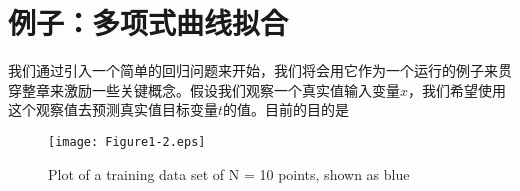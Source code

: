 \section{例子：多项式曲线拟合}
	我们通过引入一个简单的回归问题来开始，我们将会用它作为一个运行的例子来贯穿整章来激励一些关键概念。假设我们观察一个真实值输入变量$x$，我们希望使用这个观察值去预测真实值目标变量$t$的值。目前的目的是

\begin{figure}
	\centering
	\texttt{[image: Figure1-2.eps]}
	\caption{Plot of a training data set of N = 10 points, shown as blue} 
	\label{fig:endb-flow} 
\end{figure}